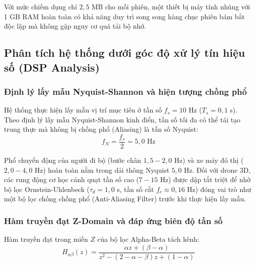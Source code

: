 Với mức chiếm dụng chỉ $2{,}5$ MB cho mỗi phiên, một thiết bị máy tính nhúng với 1 GB RAM hoàn toàn có khả năng duy trì song song hàng chục phiên bám bắt độc lập mà không gặp nguy cơ quá tải bộ nhớ.

\subsection{Phân tích hệ thống dưới góc độ xử lý tín hiệu số (DSP Analysis)}

\subsubsection{Định lý lấy mẫu Nyquist-Shannon và hiện tượng chồng phổ}

\hspace{0.5cm} Hệ thống thực hiện lấy mẫu vị trí mục tiêu ở tần số $f_s = 10$ Hz ($T_s = 0{,}1$ s). Theo định lý lấy mẫu Nyquist-Shannon kinh điển, tần số tối đa có thể tái tạo trung thực mà không bị chồng phổ (Aliasing) là tần số Nyquist:
\begin{equation}
f_N = \frac{f_s}{2} = 5{,}0\text{ Hz}
\label{eq:nyquist-frequency-limit}
\end{equation}

Phổ chuyển động của người đi bộ (bước chân $1{,}5 - 2{,}0$ Hz) và xe máy đô thị ($2{,}0 - 4{,}0$ Hz) hoàn toàn nằm trong dải thông Nyquist $5{,}0$ Hz. Đối với drone 3D, các rung động cơ học cánh quạt tần số cao ($7 - 15$ Hz) được dập tắt triệt để nhờ bộ lọc Ornstein-Uhlenbeck ($\tau_d = 1{,}0$ s, tần số cắt $f_c \approx 0{,}16$ Hz) đóng vai trò như một bộ lọc chống chồng phổ (Anti-Aliasing Filter) trước khi thực hiện lấy mẫu.

\subsubsection{Hàm truyền đạt Z-Domain và đáp ứng biên độ tần số}

\hspace{0.5cm} Hàm truyền đạt trong miền $Z$ của bộ lọc Alpha-Beta tách kênh:
\begin{equation}
H_{\alpha\beta}(z) = \frac{\alpha z + (\beta - \alpha)}{z^2 - (2 - \alpha - \beta)z + (1 - \alpha)}
\label{eq:alphabeta-transfer-z-domain}
\end{equation}


